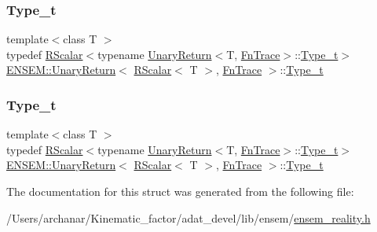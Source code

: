 \subsubsection{\texorpdfstring{Type\_t}{Type\_t}\hspace{0.1cm}{\footnotesize\ttfamily [1/2]}}
{\footnotesize\ttfamily template$<$class T $>$ \\
typedef \mbox{\hyperlink{classENSEM_1_1RScalar}{R\+Scalar}}$<$typename \mbox{\hyperlink{structENSEM_1_1UnaryReturn}{Unary\+Return}}$<$T, \mbox{\hyperlink{structENSEM_1_1FnTrace}{Fn\+Trace}}$>$\+::\mbox{\hyperlink{structENSEM_1_1UnaryReturn_3_01RScalar_3_01T_01_4_00_01FnTrace_01_4_a1fbf2ac97cda49c4f5347aa1df4559aa}{Type\+\_\+t}}$>$ \mbox{\hyperlink{structENSEM_1_1UnaryReturn}{E\+N\+S\+E\+M\+::\+Unary\+Return}}$<$ \mbox{\hyperlink{classENSEM_1_1RScalar}{R\+Scalar}}$<$ T $>$, \mbox{\hyperlink{structENSEM_1_1FnTrace}{Fn\+Trace}} $>$\+::\mbox{\hyperlink{structENSEM_1_1UnaryReturn_3_01RScalar_3_01T_01_4_00_01FnTrace_01_4_a1fbf2ac97cda49c4f5347aa1df4559aa}{Type\+\_\+t}}}

\mbox{\label{structENSEM_1_1UnaryReturn_3_01RScalar_3_01T_01_4_00_01FnTrace_01_4_a1fbf2ac97cda49c4f5347aa1df4559aa}} 
\subsubsection{\texorpdfstring{Type\_t}{Type\_t}\hspace{0.1cm}{\footnotesize\ttfamily [2/2]}}
{\footnotesize\ttfamily template$<$class T $>$ \\
typedef \mbox{\hyperlink{classENSEM_1_1RScalar}{R\+Scalar}}$<$typename \mbox{\hyperlink{structENSEM_1_1UnaryReturn}{Unary\+Return}}$<$T, \mbox{\hyperlink{structENSEM_1_1FnTrace}{Fn\+Trace}}$>$\+::\mbox{\hyperlink{structENSEM_1_1UnaryReturn_3_01RScalar_3_01T_01_4_00_01FnTrace_01_4_a1fbf2ac97cda49c4f5347aa1df4559aa}{Type\+\_\+t}}$>$ \mbox{\hyperlink{structENSEM_1_1UnaryReturn}{E\+N\+S\+E\+M\+::\+Unary\+Return}}$<$ \mbox{\hyperlink{classENSEM_1_1RScalar}{R\+Scalar}}$<$ T $>$, \mbox{\hyperlink{structENSEM_1_1FnTrace}{Fn\+Trace}} $>$\+::\mbox{\hyperlink{structENSEM_1_1UnaryReturn_3_01RScalar_3_01T_01_4_00_01FnTrace_01_4_a1fbf2ac97cda49c4f5347aa1df4559aa}{Type\+\_\+t}}}



The documentation for this struct was generated from the following file\+:\begin{DoxyCompactItemize}
\item 
/\+Users/archanar/\+Kinematic\+\_\+factor/adat\+\_\+devel/lib/ensem/\mbox{\hyperlink{lib_2ensem_2ensem__reality_8h}{ensem\+\_\+reality.\+h}}\end{DoxyCompactItemize}
